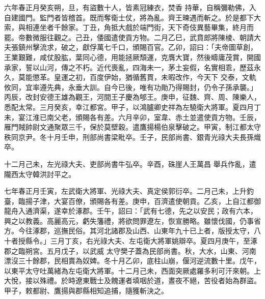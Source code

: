\begin{pinyinscope}
 六年春正月癸亥朔，旦，有盜數十人，皆素冠練衣，焚香
 持華，自稱彌勒佛，入自建國門。監門者皆稽首。既而奪衛士仗，將為亂。齊王暕遇而斬之。於是都下大索，與相連坐者千餘家。丁丑，角抵大戲於端門街，天下奇伎異藝畢集，終月而罷。帝數微服往觀之。己丑，倭國遣使貢方物。二月乙巳，武賁郎將陳棱、朝請大夫張鎮州擊流求，破之，獻俘萬七千口，頒賜百官。乙卯，詔曰：「夫帝圖草創，王業艱難，咸仗股肱，葉同心德，用能拯厥頹運，克膺大寶，然後疇庸茂賞，開國承家，誓以山河，傳之不朽。近代喪亂，四海未一，茅土妄假，名實相乖，歷茲永久，莫能懲革。皇運之初，百度伊始，猶循舊貫，未暇改作，今天下
 交泰，文軌攸同，宜率遵先典，永垂大訓。自今已後，唯有功勛乃得賜封，仍令子孫承襲。」丙辰，改封安德王雄為觀王，河間王子慶為郇王。庚申，征魏、齊、周、陳樂人，悉配太常。三月癸亥，幸江都宮。甲子，以鴻臚卿史祥為左驍衛大將軍。夏四月丁未，宴江淮已南父老，頒賜各有差。六月辛卯，室韋、赤土並遣使貢方物。壬辰，雁門賊帥尉文通聚眾三千，保於莫壁穀。遣鷹揚楊伯泉擊破之。甲寅，制江都太守秩同京尹。冬十月壬申，刑部尚書梁毗卒。壬子，民部尚書、銀青光祿大夫長孫熾卒。



 十二月己未，左光祿大夫、吏部尚書牛弘卒。辛酉，硃崖人王萬昌
 舉兵作亂，遣隴西太守韓洪討平之。



 七年春正月壬寅，左武衛大將軍、光祿大夫、真定侯郭衍卒。二月己未，上升釣臺，臨揚子津，大宴百僚，頒賜各有差。庚申，百濟遣使朝貢。乙亥，上自江都御龍舟入通濟渠，遂幸於涿郡。壬午，詔曰：「武有七德，先之以安民；政有六本，興之以教義。高麗高元，虧失籓禮，將欲問罪遼左，恢宣勝略。雖懷伐國，仍事省方。今往涿郡，巡撫民俗。其河北諸郡及山西、山東年九十已上者，版授太守，八十者授縣令。」三月丁亥，右光祿大夫、左屯衛大將軍姚辯卒。夏四月庚午，至涿郡之臨朔宮。五月戊子，以武威
 太守樊子蓋為民部尚書。秋，大水，山東、河南漂沒三十餘郡，民相賣為奴婢。冬十月乙卯，底柱山崩，偃河逆流數十里。戊午，以東平太守吐萬緒為左屯衛大將軍。十二月己未，西面突厥處羅多利可汗來朝。上大悅，接以殊禮。於時遼東戰士及餽運者填咽於道，晝夜不絕，苦役者始為群盜。甲子，敕都尉、鷹揚與郡縣相知追捕，隨獲斬決之。



\end{pinyinscope}